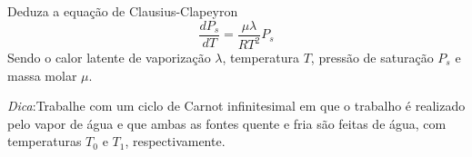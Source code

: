 Deduza a equação de Clausius-Clapeyron
\[ \frac{dP_s}{dT} = \frac{\mu\lambda}{RT^2}P_s \]
Sendo o calor latente de vaporização $\lambda$, temperatura $T$, pressão de saturação $P_s$ e massa molar $\mu$.

\textit{Dica}:Trabalhe com um ciclo de Carnot infinitesimal em que o trabalho é realizado pelo vapor de água e que ambas as fontes quente e fria são feitas de água, com temperaturas $T_0$ e $T_1$, respectivamente.
